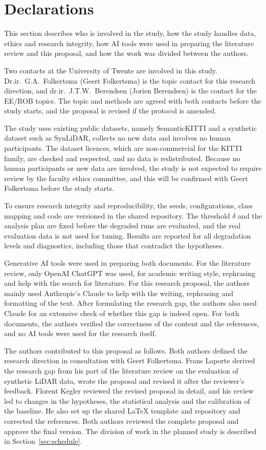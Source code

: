 \section{Declarations}\label{sec:declarations}
This section describes who is involved in the study, how the study handles data, ethics and research integrity, how AI tools were used in preparing the literature review and this proposal, and how the work was divided between the authors.

Two contacts at the University of Twente are involved in this study. Dr.ir.\ G.A.\ Folkertsma (Geert Folkertsma) is the topic contact for this research direction, and dr.ir.\ J.T.W.\ Berendsen (Jorien Berendsen) is the contact for the EE/ROB topics. The topic and methods are agreed with both contacts before the study starts, and the proposal is revised if the protocol is amended.

The study uses existing public datasets, namely SemanticKITTI and a synthetic dataset such as SynLiDAR, collects no new data and involves no human participants. The dataset licences, which are non-commercial for the KITTI family, are checked and respected, and no data is redistributed. Because no human participants or new data are involved, the study is not expected to require review by the faculty ethics committee, and this will be confirmed with Geert Folkertsma before the study starts.

To ensure research integrity and reproducibility, the seeds, configurations, class mapping and code are versioned in the shared repository. The threshold $\delta$ and the analysis plan are fixed before the degraded runs are evaluated, and the real evaluation data is not used for tuning. Results are reported for all degradation levels and diagnostics, including those that contradict the hypotheses.

Generative AI tools were used in preparing both documents. For the literature review, only OpenAI ChatGPT was used, for academic writing style, rephrasing and help with the search for literature. For this research proposal, the authors mainly used Anthropic's Claude to help with the writing, rephrasing and formatting of the text. After formulating the research gap, the authors also used Claude for an extensive check of whether this gap is indeed open. For both documents, the authors verified the correctness of the content and the references, and no AI tools were used for the research itself.

The authors contributed to this proposal as follows. Both authors defined the research direction in consultation with Geert Folkertsma. Frans Laporte derived the research gap from his part of the literature review on the evaluation of synthetic LiDAR data, wrote the proposal and revised it after the reviewer's feedback. Florent Kegler reviewed the revised proposal in detail, and his review led to changes in the hypotheses, the statistical analysis and the calibration of the baseline. He also set up the shared \LaTeX{} template and repository and corrected the references. Both authors reviewed the complete proposal and approve the final version. The division of work in the planned study is described in Section~\ref{sec:schedule}.